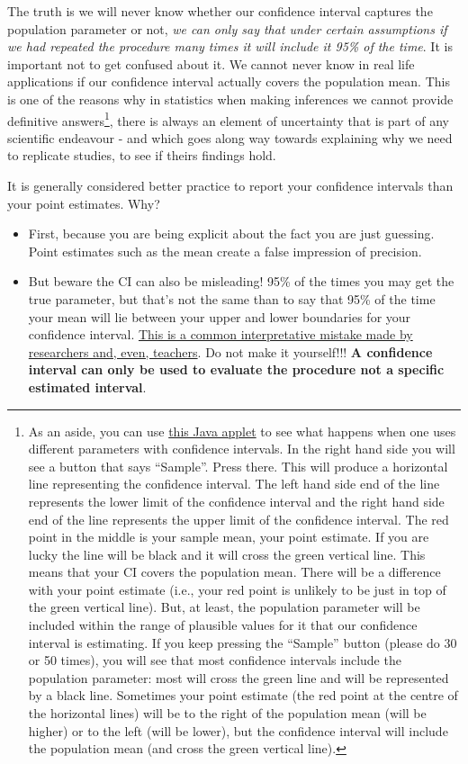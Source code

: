 \documentclass[
]{book}
\providecommand{\tightlist}{%
  \setlength{\itemsep}{0pt}\setlength{\parskip}{0pt}}
\begin{document}
The truth is we will never know whether our confidence interval captures the population parameter or not, \emph{we can only say that under certain assumptions if we had repeated the procedure many times it will include it 95\% of the time}. It is important not to get confused about it. We cannot never know in real life applications if our confidence interval actually covers the population mean. This is one of the reasons why in statistics when making inferences we cannot provide definitive answers\footnote{As an aside, you can use \href{http://bcs.whfreeman.com/ips4e/cat_010/applets/confidenceinterval.html}{this Java applet} to see what happens when one uses different parameters with confidence intervals. In the right hand side you will see a button that says ``Sample''. Press there. This will produce a horizontal line representing the confidence interval. The left hand side end of the line represents the lower limit of the confidence interval and the right hand side end of the line represents the upper limit of the confidence interval. The red point in the middle is your sample mean, your point estimate. If you are lucky the line will be black and it will cross the green vertical line. This means that your CI covers the population mean. There will be a difference with your point estimate (i.e., your red point is unlikely to be just in top of the green vertical line). But, at least, the population parameter will be included within the range of plausible values for it that our confidence interval is estimating. If you keep pressing the ``Sample'' button (please do 30 or 50 times), you will see that most confidence intervals include the population parameter: most will cross the green line and will be represented by a black line. Sometimes your point estimate (the red point at the centre of the horizontal lines) will be to the right of the population mean (will be higher) or to the left (will be lower), but the confidence interval will include the population mean (and cross the green vertical line).}, there is always an element of uncertainty that is part of any scientific endeavour - and which goes along way towards explaining why we need to replicate studies, to see if theirs findings hold.

It is generally considered better practice to report your confidence intervals than your point estimates. Why?

\begin{itemize}
\tightlist
\item
  First, because you are being explicit about the fact you are just guessing. Point estimates such as the mean create a false impression of precision.\\
\item
  But beware the CI can also be misleading! 95\% of the times you may get the true parameter, but that's not the same than to say that 95\% of the time your mean will lie between your upper and lower boundaries for your confidence interval. \href{http://link.springer.com/article/10.3758\%2Fs13423-013-0572-3}{This is a common interpretative mistake made by researchers and, even, teachers}. Do not make it yourself!!! \textbf{A confidence interval can only be used to evaluate the procedure not a specific estimated interval}.
\end{itemize}
\end{document}
